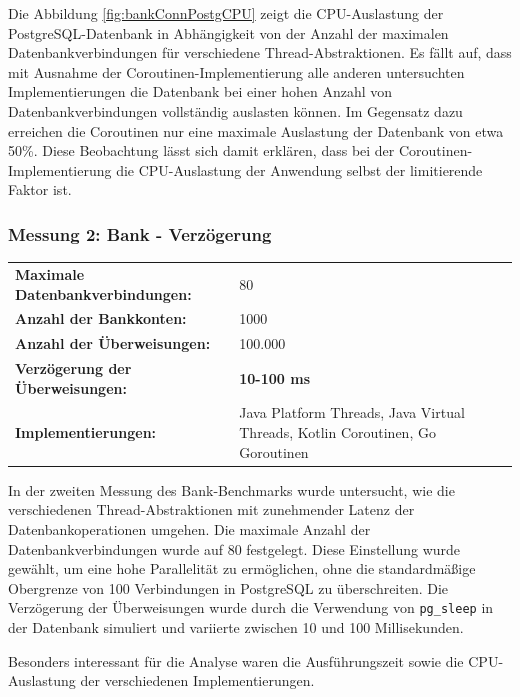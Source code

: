 \documentclass[fontsize=12pt,paper=a4,twoside=semi,parskip=half-,headsepline,headinclude]{scrreprt}
\begin{document}
Die Abbildung \ref{fig:bankConnPostgCPU} zeigt die CPU-Auslastung der PostgreSQL-Datenbank in Abhängigkeit von der Anzahl der maximalen Datenbankverbindungen für verschiedene Thread-Abstrak\-tionen. Es fällt auf, dass mit Ausnahme der Coroutinen-Implementierung alle anderen untersuchten Implementierungen die Datenbank bei einer hohen Anzahl von Datenbankverbindungen vollständig auslasten können. Im Gegensatz dazu erreichen die Coroutinen nur eine maximale Auslastung der Datenbank von etwa 50\%. Diese Beobachtung lässt sich damit erklären, dass bei der Coroutinen-Implementierung die CPU-Auslastung der Anwendung selbst der limitierende Faktor ist.

\subsubsection{Messung 2: Bank - Verzögerung}

\begin{tabularx}{\textwidth}{@{}lX@{}}
	\textbf{Maximale Datenbankverbindungen:} & 80 \\
	\textbf{Anzahl der Bankkonten:} & 1000 \\
	\textbf{Anzahl der Überweisungen:} & 100.000 \\
	\textbf{Verzögerung der Überweisungen:} & \textbf{10-100 ms} \\
	\textbf{Implementierungen:} & Java Platform Threads, Java Virtual Threads, Kotlin Coroutinen, Go Goroutinen
\end{tabularx}

In der zweiten Messung des Bank-Benchmarks wurde untersucht, wie die verschiedenen Thread-Abstraktionen mit zunehmender Latenz der Datenbankoperationen umgehen. Die maximale Anzahl der Datenbankverbindungen wurde auf 80 festgelegt. Diese Einstellung wurde gewählt, um eine hohe Parallelität zu ermöglichen, ohne die standardmäßige Obergrenze von 100 Verbindungen in PostgreSQL zu überschreiten. Die Verzögerung der Über\-wei\-sun\-gen wurde durch die Verwendung von \texttt{pg\_sleep} in der Datenbank simuliert und variierte zwischen 10 und 100 Millisekunden.

Besonders interessant für die Analyse waren die Ausführungszeit sowie die CPU-Auslastung der verschiedenen Implementierungen.
\end{document}
